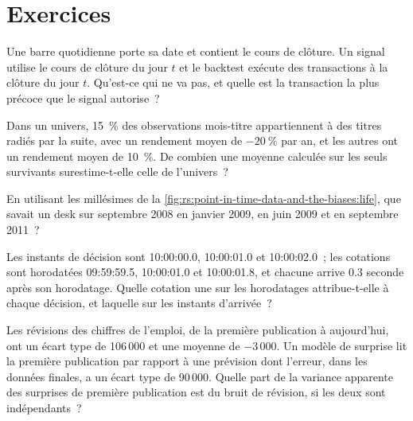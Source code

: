 \section{Exercices}

\begin{exercise}[$\star$]\label{exo:rs:point-in-time-data-and-the-biases:1}
Une barre quotidienne porte sa date et contient le cours de clôture. Un signal utilise le cours de clôture du jour $t$ et le backtest exécute des transactions à la clôture
du jour $t$. Qu'est-ce qui ne va pas, et quelle est la transaction la plus précoce que le signal autorise~?
\end{exercise}

\begin{exercise}[$\star$]\label{exo:rs:point-in-time-data-and-the-biases:2}
Dans un univers, 15~\% des observations mois-titre appartiennent à des titres radiés par la suite, avec un rendement moyen de $-20~\%$ par an, et les
autres ont un rendement moyen de 10~\%. De combien une moyenne calculée sur les seuls survivants surestime-t-elle celle de l'univers~?
\end{exercise}

\begin{exercise}[$\star$]\label{exo:rs:point-in-time-data-and-the-biases:3}
En utilisant les millésimes de la \cref{fig:rs:point-in-time-data-and-the-biases:life}, que savait un desk sur septembre 2008 en
janvier 2009, en juin 2009 et en septembre 2011~?
\end{exercise}

\begin{exercise}[$\star\star$]\label{exo:rs:point-in-time-data-and-the-biases:4}
Les instants de décision sont 10:00:00.0, 10:00:01.0 et 10:00:02.0~; les cotations sont horodatées 09:59:59.5, 10:00:01.0 et 10:00:01.8, et chacune
arrive 0.3 seconde après son horodatage. Quelle cotation une  sur les horodatages attribue-t-elle à chaque décision, et laquelle sur les
instants d'arrivée~?
\end{exercise}

\begin{exercise}[$\star\star$]\label{exo:rs:point-in-time-data-and-the-biases:5}
Les révisions des chiffres de l'emploi, de la première publication à aujourd'hui, ont un écart type de 106\,000 et une moyenne de $-3\,000$. Un modèle de surprise
lit la première publication par rapport à une prévision dont l'erreur, dans les données finales, a un écart type de 90\,000. Quelle part de la
variance apparente des surprises de première publication est du bruit de révision, si les deux sont indépendants~?
\end{exercise}

